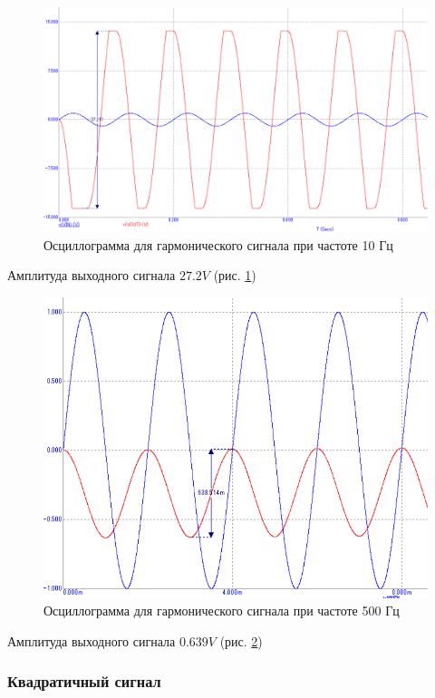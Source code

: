 \documentclass[a4paper,14pt]{article}
\begin{document}
\begin{figure}[H]
	\centering
	\includegraphics[width=0.9\linewidth]{../imgs/tran_sin_10Hz}
	\caption{Осциллограмма для гармонического сигнала при частоте 10 Гц}
	\label{fig:tran_sin_10Hz}
\end{figure}

Амплитуда выходного сигнала $27.2V$ (рис. \ref{fig:tran_sin_10Hz})

\begin{figure}[H]
	\centering
	\includegraphics[width=0.7\linewidth]{../imgs/tran_sin_500Hz}
	\caption{Осциллограмма для гармонического сигнала при частоте 500 Гц}
	\label{fig:tran_sin_500Hz}
\end{figure}

Амплитуда выходного сигнала $0.639V$ (рис. \ref{fig:tran_sin_500Hz})

\subsubsection{Квадратичный сигнал}
\end{document}
